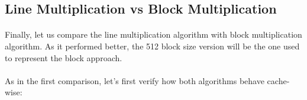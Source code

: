 \documentclass{report}
\begin{document}
			\subsection{Line Multiplication vs Block Multiplication}
				
				\paragraph{}Finally, let us compare the line multiplication algorithm with block multiplication algorithm. As it performed better, the 512 block size version will be the one used to represent the block approach.
				
				\paragraph{}As in the first comparison, let's first verify how both algorithms behave cache-wise:
				
\end{document}
